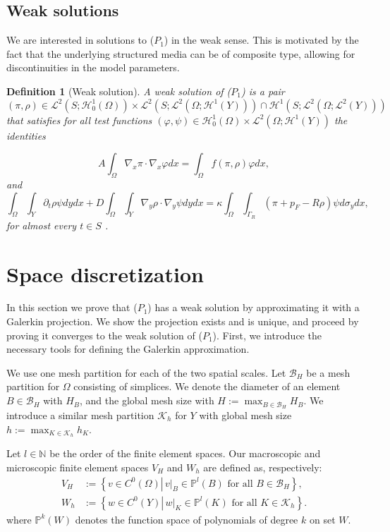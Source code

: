 \documentclass{article}
\renewcommand{\L}{\mathcal{ L}}
\newcommand{\N}{\mathbb{ N}}
\newtheorem{defin}{Definition}
\renewcommand{\H}{\mathcal{ H}}
\newcommand{\B}{\mathcal{ B}}
\renewcommand{\P}{\mathbb{ P}}
\newcommand{\K}{\mathcal{ K}}
\begin{document}
\subsection{Weak solutions}

We are interested in solutions to ($P_1$) in the weak sense. This is motivated by the fact that the underlying structured media can be of composite type, allowing for discontinuities in the model parameters.

\begin{defin}[Weak solution]
    A weak solution of ($P_1$) is a pair
    \begin{equation*}
        (\pi,\rho)\in\L^2(S;\H_0^1(\Omega))\times \L^2(S;\L^2(\Omega;\H^1(Y)))\cap \H^1(S;\L^2(\Omega;\L^2(Y)))
    \end{equation*}
    that satisfies for all test functions $(\varphi,\psi) \in \H^1_0(\Omega)\times \L^2(\Omega;\H^1(Y))$ the identities

\begin{equation}
    \label{eq:weak_pi_cont}
    A\int_\Omega\nabla_x\pi\cdot\nabla_x\varphi dx=\int_\Omega f(\pi,\rho)\varphi dx,
\end{equation}
and
\begin{equation}
    \label{eq:weak_rho_cont}
    \int_\Omega\int_Y\partial_t\rho\psi dydx+D\int_\Omega \int_Y\nabla_y \rho\cdot\nabla_y\psi dydx= \kappa\int_\Omega\int_{\Gamma_R}(\pi+p_F-R\rho)\psi d\sigma_ydx,
\end{equation}
for almost every $t \in S$ .
\end{defin}

\section{Space discretization}
\label{sec:space}
In this section we prove that ($P_1$) has a weak solution by approximating it with a Galerkin projection.
We show the projection exists and is unique, and proceed by proving it converges to the weak solution of ($P_1$).
First, we introduce the necessary tools for defining the Galerkin approximation.

We use one mesh partition for each of the two spatial scales.
Let $\B_H$ be a mesh partition for $\Omega$ consisting of simplices. We denote the diameter of an element $B \in \B_H$ with $H_B$, and the global mesh size with $H:= \max_{B \in \B_H} H_B$.
We introduce a similar mesh partition $\K_h$ for $Y$ with global mesh size $h:= \max_{K \in \K_h} h_K$.

Let $l\in \N$ be the order of the finite element spaces.
Our macroscopic and microscopic finite element spaces $V_H$ and $W_h$ are defined as, respectively:
\begin{align*}
    V_H &:= \left\{ \left. v \in C^0(\Omega)\right|\,v|_B \in \P^l(B) \mbox{ for all } B \in \B_H  \right\},\\
        W_h &:= \left\{ \left. w \in C^0(Y)\right|\,w|_K \in \P^l(K) \mbox{ for all } K \in \K_h  \right\}.
\end{align*}
where $\P^k(W)$ denotes the function space of polynomials of degree $k$ on set $W$.
\end{document}
